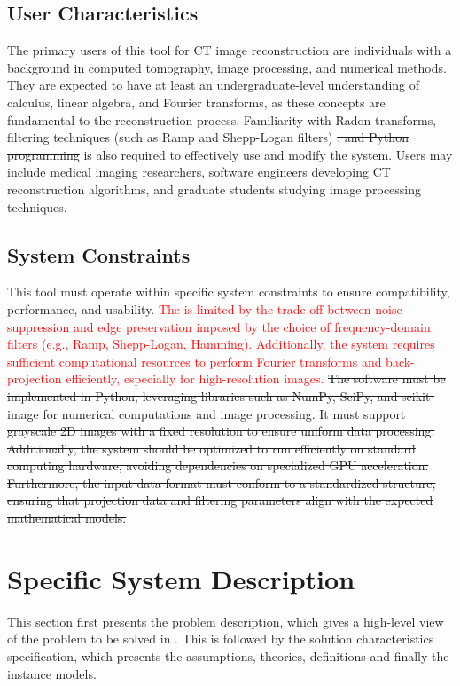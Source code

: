 \documentclass[12pt]{article}
\newcommand{\add}{\textcolor{red}}
\begin{document}
\subsection{User Characteristics} \label{SecUserCharacteristics} The primary
users of this tool for CT image reconstruction are individuals with a background
in computed tomography, image processing, and numerical methods. They are
expected to have at least an undergraduate-level understanding of calculus,
linear algebra, and Fourier transforms, as these concepts are fundamental to the
reconstruction process. Familiarity with Radon transforms, filtering techniques
(such as Ramp and Shepp-Logan filters) \st{, and Python programming} is also required
to effectively use and modify the system. Users may include medical imaging
researchers, software engineers developing CT reconstruction algorithms, and
graduate students studying image processing techniques.

\subsection{System Constraints}
This tool must operate within specific system constraints to ensure
compatibility, performance, and usability. \add{The \progname \space is limited
  by the trade-off between noise suppression and edge preservation imposed by
  the choice of frequency-domain filters (e.g., Ramp, Shepp-Logan, Hamming).
  Additionally, the system requires sufficient computational resources to
  perform Fourier transforms and back-projection efficiently, especially for
  high-resolution images.}
\st{The software must be implemented in Python, leveraging libraries
  such as NumPy, SciPy, and scikit-image for numerical computations and image
  processing. It must support grayscale 2D images with a fixed resolution to
  ensure uniform data
  processing.\\

Additionally, the system should be optimized to run efficiently on
standard computing hardware, avoiding dependencies on specialized GPU
acceleration. Furthermore, the input data format must conform to a standardized
structure, ensuring that projection data and filtering parameters align with the
expected mathematical models.
}
\section{Specific System Description} \label{specific description} This section
first presents the problem description, which gives a high-level view of the
problem to be solved in \progname{}. This is followed by the solution
characteristics specification, which presents the assumptions, theories,
definitions and finally the instance models.
\end{document}
